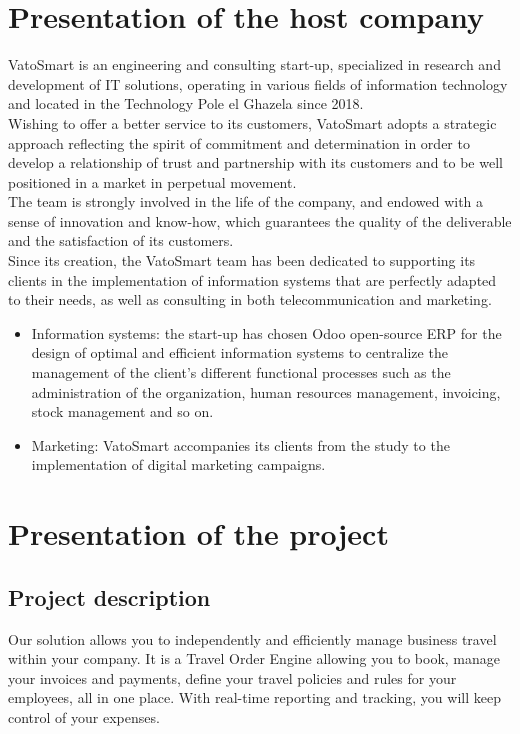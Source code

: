 \section{Presentation of the host company}
VatoSmart is an engineering and consulting start-up, specialized in research and development of IT solutions, operating in various fields of information technology and located in the Technology Pole el Ghazela since 2018.\\
Wishing to offer a better service to its customers, VatoSmart adopts a strategic approach reflecting the spirit of commitment and determination in order to develop a relationship of trust and partnership with its customers and to be well positioned in a market in perpetual movement.   \\
The team is strongly involved in the life of the company, and endowed with a sense of innovation and know-how, which guarantees the quality of the deliverable and the satisfaction of its customers. \\
Since its creation, the VatoSmart team has been dedicated to supporting its clients in the implementation of information systems that are perfectly adapted to their needs, as well as consulting in both telecommunication and marketing.
\begin{itemize}
\item Information systems: the start-up has chosen Odoo open-source ERP for the design of optimal and efficient information systems to centralize the management of the client's different functional processes such as the administration of the organization, human resources management, invoicing, stock management and so on. 


\item Marketing: VatoSmart accompanies its clients from the study to the implementation of digital marketing campaigns.
\end{itemize}

\section{Presentation of the project}


\subsection{Project description}
Our solution allows you to independently and efficiently manage business travel within your company. It is a Travel Order Engine allowing you to book, manage your invoices and payments, define your travel policies and rules for your employees, all in one place. With real-time reporting and tracking, you will keep control of your expenses.
